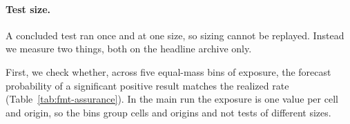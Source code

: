\documentclass[sigconf,nonacm]{acmart}
\begin{document}
\label{sec:testsize-protocol}
\paragraph{Test size.} A concluded test ran once and at one size, so sizing cannot be replayed. Instead we measure two things, both on the headline archive only.

First, we check whether, across five equal-mass bins of exposure, the forecast probability of a significant positive result matches the realized rate (Table~\ref{tab:fmt-assurance}). In the main run the exposure is one value per cell and origin, so the bins group cells and origins and not tests of different sizes.
\end{document}
